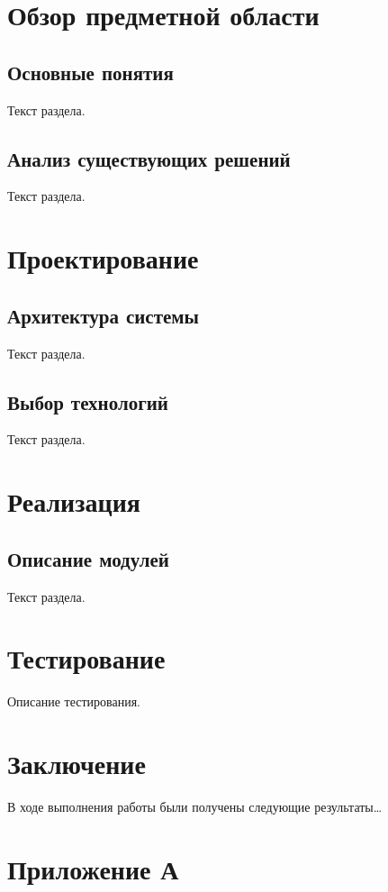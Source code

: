 \documentclass[12pt, a4paper]{article}
\begin{document}
\newpage
\section{Обзор предметной области}

\subsection{Основные понятия}
Текст раздела.

\subsection{Анализ существующих решений}
Текст раздела.

\newpage
\section{Проектирование}

\subsection{Архитектура системы}
Текст раздела.

\subsection{Выбор технологий}
Текст раздела.

\newpage
\section{Реализация}

\subsection{Описание модулей}
Текст раздела.

\newpage
\section{Тестирование}

Описание тестирования.

\newpage
\section*{Заключение}

В ходе выполнения работы были получены следующие результаты\ldots

\newpage
\printbibliography[title={Список литературы}]

\newpage
\section*{Приложение А}
\end{document}
